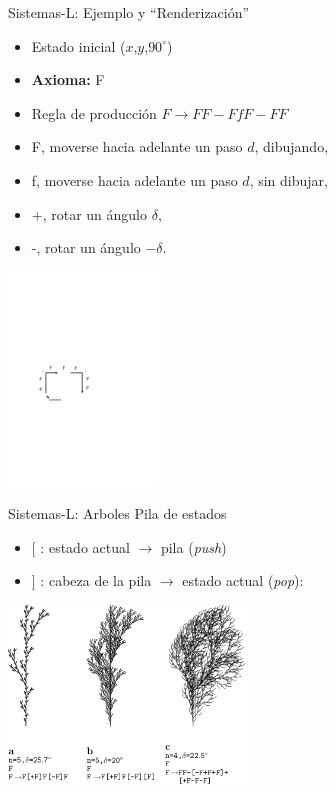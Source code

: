 \documentclass[spanish,unknownkeysallowed]{beamer}
\begin{document}
\begin{frame}{Sistemas-L: Ejemplo y ``Renderización''}
\begin{itemize}
\item Estado inicial ($x$,$y$,$90^{\circ}$)
\item \textbf{Axioma:} F
\item Regla de producción $F \rightarrow FF-FfF-FF$
\end{itemize}

\begin{itemize}
\item F, moverse hacia adelante un paso $d$, dibujando,
\item f, moverse hacia adelante un paso $d$, sin dibujar,
\item +, rotar un ángulo $\delta$,
\item -, rotar un ángulo $-\delta$.
\end{itemize}

\center
\includegraphics[width=4cm]{../figures/tortuga}

\end{frame}

\begin{frame}{Sistemas-L: Arboles}
Pila de estados
\begin{itemize}
\item $[$ : estado actual $\rightarrow$ pila ({\em push})
\item $]$ : cabeza de la pila $\rightarrow$ estado actual ({\em pop}):
\end{itemize}

\center
\includegraphics[width=6.3cm]{../figures/sistemalcorchete}

\end{frame}
\end{document}
